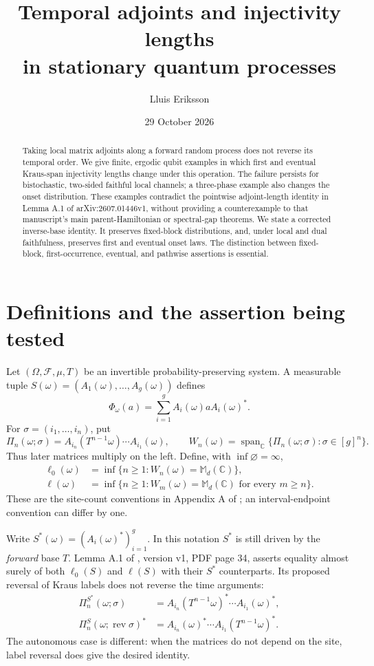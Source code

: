 \documentclass[11pt,a4paper]{article}
\title{Temporal adjoints and injectivity lengths\\in stationary quantum processes}
\author{Lluis Eriksson}
\date{29 October 2026}
\newcommand{\M}{\mathbb M_d(\mathbb C)}
\newcommand{\Span}{\operatorname{span}}
\begin{document}
\maketitle
\begin{abstract}
Taking local matrix adjoints along a forward random process does not reverse its temporal order. We give finite, ergodic qubit examples in which first and eventual Kraus-span injectivity lengths change under this operation. The failure persists for bistochastic, two-sided faithful local channels; a three-phase example also changes the onset distribution. These examples contradict the pointwise adjoint-length identity in Lemma A.1 of arXiv:2607.01446v1, without providing a counterexample to that manuscript's main parent-Hamiltonian or spectral-gap theorems. We state a corrected inverse-base identity. It preserves fixed-block distributions, and, under local and dual faithfulness, preserves first and eventual onset laws. The distinction between fixed-block, first-occurrence, eventual, and pathwise assertions is essential.
\end{abstract}

\section{Definitions and the assertion being tested}
Let $(\Omega,\mathcal F,\mu,T)$ be an invertible probability-preserving system. A measurable tuple
$S(\omega)=(A_1(\omega),\ldots,A_g(\omega))$ defines
\[
 \Phi_\omega(a)=\sum_{i=1}^g A_i(\omega)aA_i(\omega)^*.
\]
For $\sigma=(i_1,\ldots,i_n)$, put
\[
 \Pi_n(\omega;\sigma)=A_{i_n}(T^{n-1}\omega)\cdots A_{i_1}(\omega),
 \qquad W_n(\omega)=\Span_{\mathbb C}\{\Pi_n(\omega;\sigma):\sigma\in[g]^n\}.
\]
Thus later matrices multiply on the left. Define, with $\inf\varnothing=\infty$,
\begin{align*}
 \ell_0(\omega)&=\inf\{n\geq1:W_n(\omega)=\M\},\\
 \ell(\omega)&=\inf\{n\geq1:W_m(\omega)=\M\text{ for every }m\geq n\}.
\end{align*}
These are the site-count conventions in Appendix A of \cite{EMPS}; an interval-endpoint convention can differ by one.

Write $S^*(\omega)=(A_i(\omega)^*)_{i=1}^g$. In this notation $S^*$ is still driven by the \emph{forward} base $T$. Lemma A.1 of \cite{EMPS}, version v1, PDF page 34, asserts equality almost surely of both $\ell_0(S)$ and $\ell(S)$ with their $S^*$ counterparts. Its proposed reversal of Kraus labels does not reverse the time arguments:
\begin{align*}
 \Pi_n^{S^*}(\omega;\sigma)
 &=A_{i_n}(T^{n-1}\omega)^*\cdots A_{i_1}(\omega)^*,\\
 \Pi_n^S(\omega;\operatorname{rev}\sigma)^*
 &=A_{i_n}(\omega)^*\cdots A_{i_1}(T^{n-1}\omega)^*.
\end{align*}
The autonomous case is different: when the matrices do not depend on the site, label reversal does give the desired identity.
\end{document}
